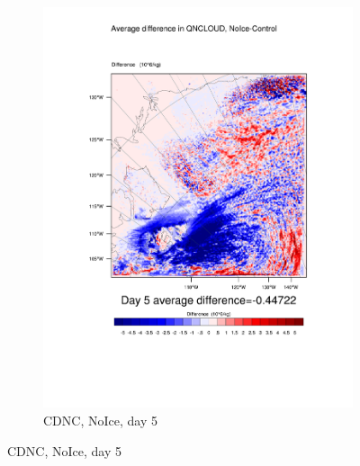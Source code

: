 \begin{figure}[hb]
\begin{subfigure}{0.48\textwidth}
		\includegraphics[width=\textwidth]{results/noice/diff_NoIce_QNCLOUD_Day5.pdf}
		\caption{CDNC, NoIce, day 5}
		\label{subfig:CDNCr2Day5}
	\end{subfigure}
	

\end{figure}
